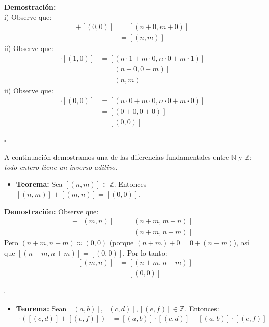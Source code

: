 \documentclass[10 pt]{article}
\begin{document}
\Large{\textbf{Demostración:} \\

i) Observe que:}
\begin{align*}
    [(n,m)]+[(0,0)]&=[(n+0,m+0)] \\
    &=[(n,m)]
\end{align*}
\Large{ii) Observe que:}
\begin{align*}
    [(n,m)] \cdot [(1,0)]&=[(n \cdot 1+m \cdot 0,n \cdot 0+m \cdot 1)] \\
    &=[(n+0,0+m)] \\
    &=[(n,m)]
\end{align*}
\Large{ii) Observe que:}
\begin{align*}
    [(n,m)] \cdot [(0,0)]&=[(n \cdot 0+m \cdot 0,n \cdot 0+m \cdot 0)] \\
    &=[(0+0,0+0)] \\
    &=[(0,0)]
\end{align*}

\begin{flushright}
    $\square$
\end{flushright}

\Large{A continuación demostramos una de las diferencias fundamentales entre $\mathbb N$ y $\mathbb Z$: \textit{todo entero tiene un inverso aditivo}.} \\

\begin{itemize}
    \item \Large{\textbf{Teorema:} Sea $[(n,m)] \in \mathbb Z$. Entonces $[(n,m)]+[(m,n)]=[(0,0)]$.} \\
\end{itemize}

\Large{\textbf{Demostración:} Observe que:}
\begin{align*}
    [(n,m)]+[(m,n)]&=[(n+m,m+n)] \\
    &=[(n+m,n+m)]
\end{align*}
\Large{Pero $(n+m,n+m) \approx (0,0)$ (porque $(n+m)+0=0+(n+m)$), así que $[(n+m,n+m)]=[(0,0)]$. Por lo tanto:}
\begin{align*}
    [(n,m)]+[(m,n)]&=[(n+m,n+m)] \\
    &=[(0,0)]
\end{align*}

\begin{flushright}
    $\square$
\end{flushright}

\begin{itemize}
    \item \Large{\textbf{Teorema:} Sean $[(a,b)],[(c,d)],[(e,f)] \in \mathbb Z$. Entonces:}
    \begin{align*}
        [(a,b)] \cdot ([(c,d)]+[(e,f)])&=[(a,b)] \cdot[(c,d)]+[(a,b)] \cdot [(e,f)]
    \end{align*}
\end{itemize}
\end{document}
